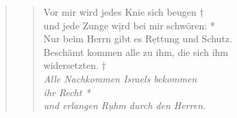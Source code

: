 \begin{quote}
\begin{verse}
Vor mir wird jedes Knie sich beugen †\\ und jede Zunge w\d ird bei mir schwören: *\\
Nur beim Herrn gibt es R\d ettung und Schutz. \\
\vin Beschämt kommen alle zu ihm, die sich ihm\\ \vin widersetzten. †\\
\textit{Alle Nachkommen Israels bekommen\\ ihr Recht *\\
und erlangen R\d uhm durch den Herren.}\\



\end{verse}

\end{quote}

\vspace{0.3cm}


\def\greinitialformat#1{{\fontsize{40}{40}\selectfont #1}}
\gresetfirstlineaboveinitial{\small \textcolor{red}{Hab 3}}{}
\setaboveinitialseparation{0.72mm}

\vspace{0.3cm}


